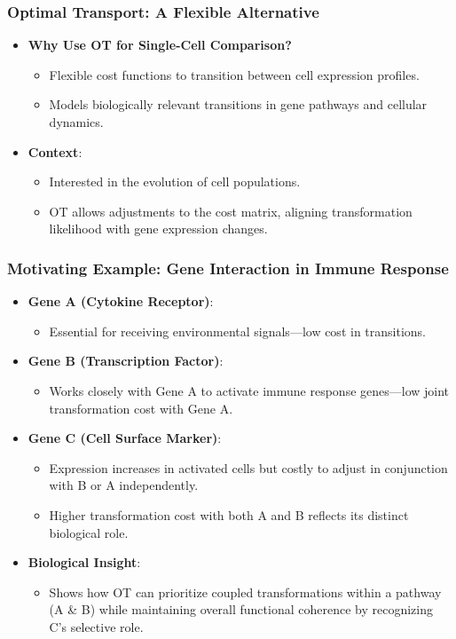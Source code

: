 \documentclass{beamer}
\begin{document}
		\begin{frame}
			\frametitle{Optimal Transport: A Flexible Alternative}
\begin{itemize}
	\item \textbf{Why Use OT for Single-Cell Comparison?}
	\begin{itemize}
		\item Flexible cost functions to transition between cell expression profiles.
		\item Models biologically relevant transitions in gene pathways and cellular dynamics.
	\end{itemize}
	
	\item \textbf{Context}:
		\begin{itemize}
			\item Interested in the evolution of cell populations.
			\item OT allows adjustments to the cost matrix, aligning transformation likelihood with gene expression changes.
		\end{itemize}
	\end{itemize}
		\end{frame}
		
		\begin{frame}
			\frametitle{Motivating Example: Gene Interaction in Immune Response}
			\begin{itemize}
				\item \textbf{Gene A (Cytokine Receptor)}:
				\begin{itemize}
					\item Essential for receiving environmental signals—low cost in transitions.
				\end{itemize}
				
				\item \textbf{Gene B (Transcription Factor)}:
				\begin{itemize}
					\item Works closely with Gene A to activate immune response genes—low joint transformation cost with Gene A.
				\end{itemize}
				
				\item \textbf{Gene C (Cell Surface Marker)}:
				\begin{itemize}
					\item Expression increases in activated cells but costly to adjust in conjunction with B or A independently.
					\item Higher transformation cost with both A and B reflects its distinct biological role.
				\end{itemize}
				
				\item \textbf{Biological Insight}:
					\begin{itemize}
						\item Shows how OT can prioritize coupled transformations within a pathway (A \& B) while maintaining overall functional coherence by recognizing C's selective role.
					\end{itemize}
				\end{itemize}
			\end{frame}
			
\end{document}
